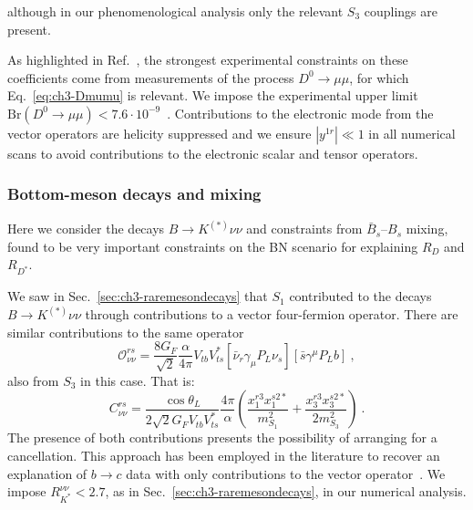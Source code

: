 \noindent although in our phenomenological analysis only the relevant $S_{3}$ couplings
are present.

As highlighted in Ref.~\cite{Fajfer:2015mia}, the strongest experimental
constraints on these coefficients come from measurements of the process
$D^0 \to \mu\mu$, for which Eq.~\eqref{eq:ch3-Dmumu} is relevant. We impose the
experimental upper limit
$\text{Br}(D^0 \rightarrow \mu\mu) < 7.6 \cdot 10^{-9}$~\cite{Aaij:2013cza}.
Contributions to the electronic mode from the vector operators are helicity
suppressed and we ensure $|y^{1r}| \ll 1$ in all numerical scans to avoid
contributions to the electronic scalar and tensor operators.


\subsubsection{Bottom-meson decays and mixing}

Here we consider the decays $B \to K^{(*)} \nu\nu$ and constraints from
$\bar{B}_{s}$--$B_{s}$ mixing, found to be very important constraints on the BN
scenario for explaining $R_{D}$ and $R_{D^{*}}$.

We saw in Sec.~\ref{sec:ch3-raremesondecays} that $S_{1}$ contributed to the
decays $B \to K^{(*)} \nu \nu$ through contributions to a vector four-fermion
operator. There are similar contributions to the same operator
\begin{equation}
  \label{eq:onunu}
  \mathcal{O}^{rs}_{\nu\nu} =\frac{8 G_F}{\sqrt{2}} \frac{\alpha}{4\pi} V_{tb} V_{ts}^*[\bar{\nu}_r  \gamma_\mu P_L \nu_s][\bar{s} \gamma^\mu P_L b] \ ,
\end{equation}
also from $S_{3}$ in this case. That is:
\begin{equation}
  C_{\nu\nu}^{rs} = \frac{\cos \theta_L}{2\sqrt{2} G_F V_{tb} V_{ts}^*} \frac{4\pi}{\alpha} \left( \frac{x_{1}^{r3} x^{s2*}_{1}}{m_{S_{1}}^2} + \frac{x^{r3}_3   x^{s2*}_{3} }{2m_{S_{3}}^2}\right) \ .
\end{equation}
The presence of both contributions presents the possibility of arranging for a
cancellation. This approach has been employed in the literature to recover an
explanation of $b \to c$ data with only contributions to the vector
operator~\cite{Crivellin:2017zlb}. We impose $R_{K^{*}}^{\nu\nu} < 2.7$, as in
Sec.~\ref{sec:ch3-raremesondecays}, in our numerical analysis.


